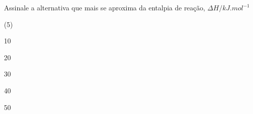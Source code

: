 \begin{problem}

Assinale a alternativa que mais se aproxima da entalpia de reação, $\Delta H/\unit{kJ.mol^{-1}}$

\begin{options}(5)
    \item 10
    \item 20
    \item 30
    \item 40
    \item 50
\end{options}

\end{problem}
